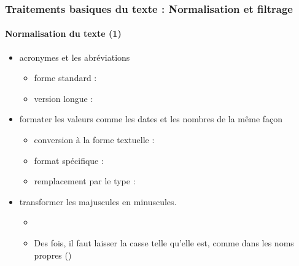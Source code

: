 \documentclass[xcolor=table]{beamer}
\begin{document}
\begin{frame}
\frametitle{Traitements basiques du texte : Normalisation et filtrage}
\framesubtitle{Normalisation du texte (1)}

\begin{itemize}
	
	\item acronymes et les abréviations 
	\begin{itemize}
		\item forme standard : 
		\item version longue : 
	\end{itemize}
	
	\item formater les valeurs comme les dates et les nombres de la même façon
	\begin{itemize}
		\item conversion à la forme textuelle : 
		\item format spécifique : 
		\item remplacement par le type : 
	\end{itemize}
	
	\item transformer les majuscules en minuscules. 
	\begin{itemize}
		\item {}
		\item Des fois, il faut laisser la casse telle qu'elle est, comme dans les noms propres ()
	\end{itemize}
\end{itemize}

\end{frame}
\end{document}
